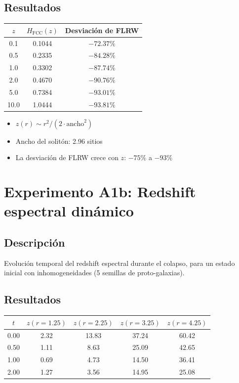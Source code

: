 \documentclass[12pt]{article}
\begin{document}
\subsection{Resultados}
\begin{center}
\begin{tabular}{ccc}
\toprule
$z$ & $H_{\text{FCC}}(z)$ & Desviaci\'on de FLRW \\
\midrule
0.1 & 0.1044 & $-72.37\%$ \\
0.5 & 0.2335 & $-84.28\%$ \\
1.0 & 0.3302 & $-87.74\%$ \\
2.0 & 0.4670 & $-90.76\%$ \\
5.0 & 0.7384 & $-93.01\%$ \\
10.0 & 1.0444 & $-93.81\%$ \\
\bottomrule
\end{tabular}
\end{center}

\begin{itemize}
  \item $z(r) \sim r^2/(2\cdot\text{ancho}^2)$
  \item Ancho del solit\'on: 2.96 sitios
  \item La desviaci\'on de FLRW crece con $z$: $-75\%$ a $-93\%$
\end{itemize}

\section{Experimento A1b: Redshift espectral din\'amico}

\subsection{Descripci\'on}
Evoluci\'on temporal del redshift espectral durante el colapso, para un estado inicial con inhomogeneidades (5 semillas de proto-galaxias).

\subsection{Resultados}
\begin{center}
\begin{tabular}{ccccc}
\toprule
$t$ & $z(r=1.25)$ & $z(r=2.25)$ & $z(r=3.25)$ & $z(r=4.25)$ \\
\midrule
0.00 & 2.32 & 13.83 & 37.24 & 60.42 \\
0.50 & 1.11 & 8.63 & 25.09 & 42.65 \\
1.00 & 0.69 & 4.73 & 14.50 & 36.41 \\
2.00 & 1.27 & 3.56 & 14.95 & 25.08 \\
\bottomrule
\end{tabular}
\end{center}
\end{document}
